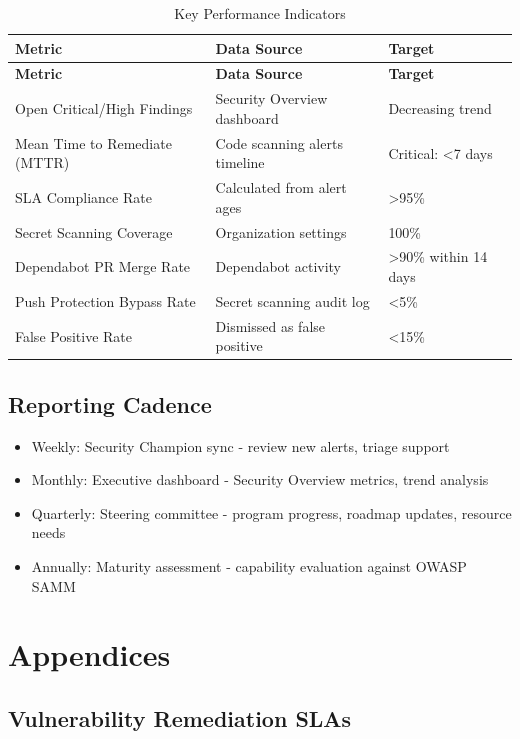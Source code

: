 \documentclass[11pt]{article}
\begin{document}
\begin{longtable}{p{}p{}p{}}
\caption{Key Performance Indicators}\label{tab:kpis}\\
\toprule
\textbf{Metric} & \textbf{Data Source} & \textbf{Target} \\
\midrule
\endfirsthead
\toprule
\textbf{Metric} & \textbf{Data Source} & \textbf{Target} \\
\midrule
\endhead
\bottomrule
\endfoot
Open Critical/High Findings & Security Overview dashboard & Decreasing trend \\
Mean Time to Remediate (MTTR) & Code scanning alerts timeline & Critical: \textless{}7 days \\
SLA Compliance Rate & Calculated from alert ages & \textgreater{}95\% \\
Secret Scanning Coverage & Organization settings & 100\% \\
Dependabot PR Merge Rate & Dependabot activity & \textgreater{}90\% within 14 days \\
Push Protection Bypass Rate & Secret scanning audit log & \textless{}5\% \\
False Positive Rate & Dismissed as false positive & \textless{}15\% \\
\end{longtable}

\subsection{Reporting Cadence}

\begin{itemize}[leftmargin=*]
\item Weekly: Security Champion sync - review new alerts, triage support
\item Monthly: Executive dashboard - Security Overview metrics, trend analysis
\item Quarterly: Steering committee - program progress, roadmap updates, resource needs
\item Annually: Maturity assessment - capability evaluation against OWASP SAMM
\end{itemize}
\section{Appendices}

\subsection{Vulnerability Remediation SLAs}
\end{document}
